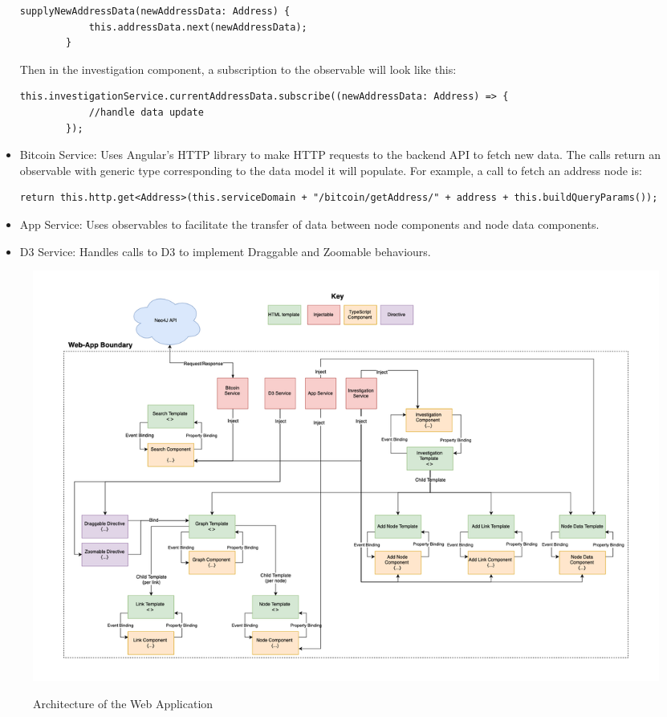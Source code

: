 \begin{itemize}
\begin{lstlisting}[breaklines=true, basicstyle=\small]
        supplyNewAddressData(newAddressData: Address) {
            this.addressData.next(newAddressData);
        }
    \end{lstlisting}
    Then in the investigation component, a subscription to the observable will look like this:
    \begin{lstlisting}[breaklines=true, basicstyle=\small]
        this.investigationService.currentAddressData.subscribe((newAddressData: Address) => {
            //handle data update
        });
    \end{lstlisting}
    \item Bitcoin Service: Uses Angular's HTTP library to make HTTP requests to the backend API to fetch new data. The calls return an observable with generic type corresponding to the data model it will populate. For example, a call to fetch an address node is:
    \begin{lstlisting}[breaklines=true, basicstyle=\small]
        return this.http.get<Address>(this.serviceDomain + "/bitcoin/getAddress/" + address + this.buildQueryParams()); 
    \end{lstlisting}
    \item App Service: Uses observables to facilitate the transfer of data between node components and node data components. 
    \item D3 Service: Handles calls to D3 to implement Draggable and Zoomable behaviours. 
\end{itemize}

\begin{figure}
  \centering
  \includegraphics[width = 22cm]{./figures/webapp-architecture}\\[0.5cm]
  \caption{Architecture of the Web Application}
  \label{fig:webapp-architecture}
\end{figure}

